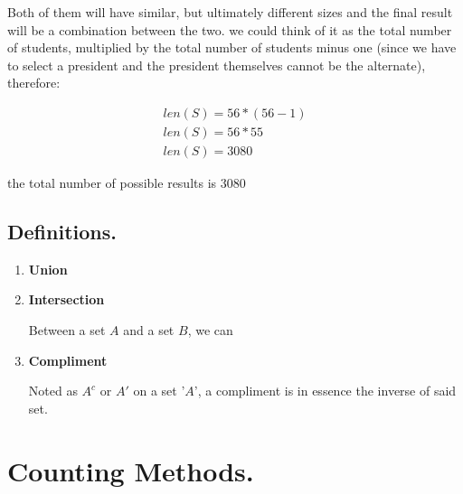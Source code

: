 \documentclass[11pt,fleqn]{book} %
\begin{document}
Both of them will have similar, but ultimately different sizes and the final result will be a combination
between the two. we could think of it as the total number of students, multiplied by the total number of
students minus one (since we have to select a president and the president themselves cannot be the alternate), 
therefore:

\begin{gather}
    len(S) = 56 * (56-1) \\
    len(S) = 56 * 55 \\
    len(S) = 3080
\end{gather}

the total number of possible results is 3080


\section{Definitions.}
\begin{enumerate}
    \item \textbf{Union}
    
    \item \textbf{Intersection}

    Between a set $ A $ and a set $ B $, we can

    \item \textbf{Compliment}
    
    Noted as $ A^c $ or $ A' $ on a set '$ A $', a compliment is in essence the inverse 
    of said set.

    
\end{enumerate}

\chapter{Counting Methods.}







\end{document}
